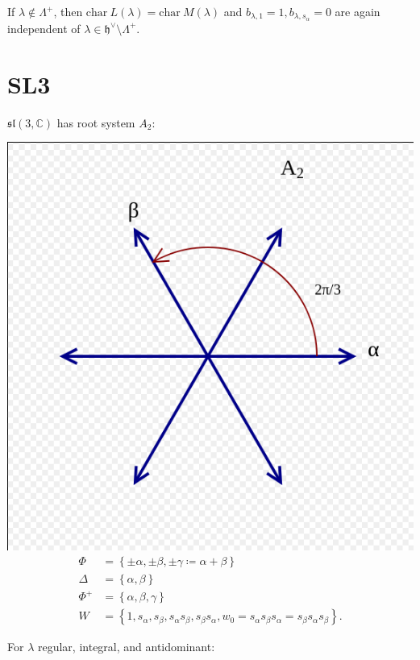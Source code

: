 \documentclass[11pt]{scrartcl}
\theoremstyle{definition}
\theoremstyle{theorem}
\theoremstyle{proof}
\theoremstyle{definition}
\theoremstyle{break}
\theoremstyle{problem}
\newcommand{\CC}[0]{{\mathbb{C}}}
\newcommand{\ch}[0]{\mathrm{char}~}
\newcommand{\definedas}[0]{\coloneqq}
\newcommand{\dual}[0]{^\vee}
\newcommand{\lieh}[0]{{\mathfrak{h}}}
\newcommand{\liesl}[0]{{\mathfrak{sl}}}
\newcommand{\theset}[1]{\left\{{#1}\right\}}
\begin{document}
If \(\lambda \not\in\Lambda^+\), then
\(\ch L(\lambda) = \ch M(\lambda)\) and
\(b_{\lambda, 1} = 1, b_{\lambda, s_\alpha} = 0\) are again independent
of \(\lambda \in \lieh\dual \setminus \Lambda^+\).

\hypertarget{sl3}{%
\section{SL3}\label{sl3}}

\(\liesl(3, \CC)\) has root system \(A_2\):

\includegraphics{figures/image_2020-05-01-16-37-30.png}\\

\begin{align*}
\Phi &= \theset{\pm \alpha, \pm \beta, \pm\gamma \definedas \alpha + \beta} \\
\Delta &= \theset{\alpha, \beta} \\
\Phi^+ &= \theset{\alpha, \beta, \gamma} \\
W &= \theset{1, s_\alpha, s_\beta, s_\alpha s_\beta, s_\beta s_\alpha, w_0 = s_\alpha s_\beta s_\alpha = s_\beta s_\alpha s_\beta}
.\end{align*}

For \(\lambda\) regular, integral, and antidominant:
\end{document}
